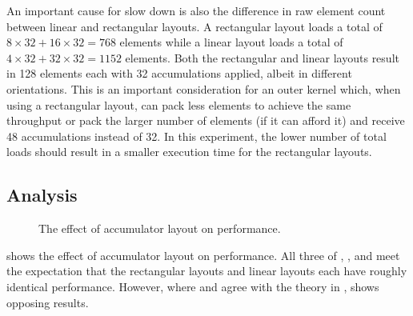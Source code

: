 \documentclass[\main/thesis.tex]{subfiles}
\begin{document}
An important cause for slow down is also the difference in raw element count between linear and rectangular layouts.
A rectangular layout loads a total of $8 \times 32 + 16 \times 32 = 768$ elements while a linear layout loads a total of $4 \times 32 + 32 \times 32 = 1152$ elements.
Both the rectangular and linear layouts result in 128 elements each with 32 accumulations applied, albeit in different orientations.
This is an important consideration for an outer kernel which, when using a rectangular layout, can pack less elements to achieve the same throughput or pack the larger number of elements (if it can afford it) and receive 48 accumulations instead of 32.
In this experiment, the lower number of total loads should result in a smaller execution time for the rectangular layouts.

\subsection{Analysis}
\label{sec:layoutAnalysis}
\begin{figure}[t]
  \centering
  
  \caption{The effect of accumulator layout on performance.}
  \label{fig:tightAccLayout}
\end{figure}

 shows the effect of accumulator layout on performance.
All three of , , and  meet the expectation that the rectangular layouts and linear layouts each have roughly identical performance.
However, where  and  agree with the theory in ,  shows opposing results.
\end{document}
